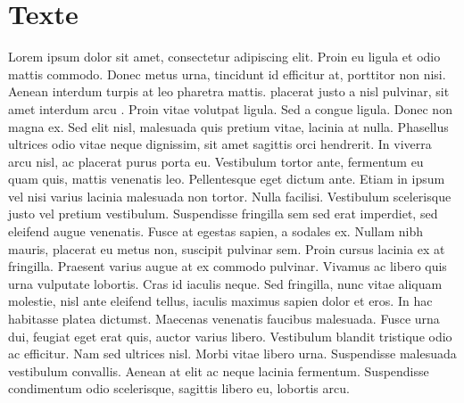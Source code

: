 \documentclass[a4paper,12pt]{article}
\begin{document}
\section{Texte}
\beginnumbering
\pstart
Lorem ipsum dolor sit amet, consectetur adipiscing elit. Proin eu ligula et odio mattis commodo. Donec metus urna, tincidunt id efficitur at, porttitor non nisi. Aenean interdum turpis at leo pharetra mattis.  placerat justo a nisl pulvinar, sit amet interdum arcu . Proin vitae volutpat ligula. Sed a congue ligula. Donec non magna ex. Sed elit nisl, malesuada quis pretium vitae, lacinia at nulla. Phasellus ultrices odio vitae neque dignissim, sit amet sagittis orci hendrerit. In viverra arcu nisl, ac placerat purus porta eu. Vestibulum tortor ante, fermentum eu quam quis, mattis venenatis leo. Pellentesque eget dictum ante. Etiam in ipsum vel nisi varius lacinia malesuada non tortor.
\pend\pstart
Nulla facilisi. Vestibulum scelerisque justo vel pretium vestibulum. Suspendisse fringilla sem sed erat imperdiet, sed eleifend augue venenatis. Fusce at egestas sapien, a sodales ex. Nullam nibh mauris, placerat eu metus non, suscipit pulvinar sem. Proin cursus lacinia ex at fringilla. Praesent varius augue at ex commodo pulvinar.
\pend\pstart
Vivamus ac libero quis urna vulputate lobortis.  Cras id iaculis neque. Sed fringilla, nunc vitae aliquam molestie, nisl ante eleifend tellus, iaculis maximus sapien dolor et eros.
\pend\pstart
In hac habitasse platea dictumst. Maecenas venenatis faucibus malesuada. Fusce urna dui, feugiat eget erat quis, auctor varius libero. Vestibulum blandit tristique odio ac efficitur. Nam sed ultrices nisl. Morbi vitae libero urna. Suspendisse malesuada vestibulum convallis. Aenean at elit ac neque lacinia fermentum. Suspendisse condimentum odio scelerisque, sagittis libero eu, lobortis arcu.
\pend
\endnumbering

\bigskip
{}
\end{document}
